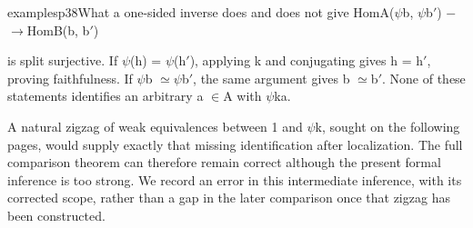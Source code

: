 \begin{dcomment}{examples}{p38}{What a one-sided inverse does and does not give}
HomA(\ensuremath{\psi}b, \ensuremath{\psi}b\ensuremath{\prime}) \ensuremath{-}\ensuremath{\to}HomB(b, b\ensuremath{\prime})

is split surjective. If \ensuremath{\psi}(h) = \ensuremath{\psi}(h\ensuremath{\prime}), applying k and conjugating gives h = h\ensuremath{\prime}, proving faithfulness. If \ensuremath{\psi}b \ensuremath{\simeq}\ensuremath{\psi}b\ensuremath{\prime}, the same argument gives b \ensuremath{\simeq}b\ensuremath{\prime}. None of these statements identifies an arbitrary a \ensuremath{\in}A with \ensuremath{\psi}ka.

A natural zigzag of weak equivalences between 1 and \ensuremath{\psi}k, sought on the following pages, would supply exactly that missing identification after localization. The full comparison theorem can therefore remain correct although the present formal inference is too strong. We record an error in this intermediate inference, with its corrected scope, rather than a gap in the later comparison once that zigzag has been constructed.

\end{dcomment}

